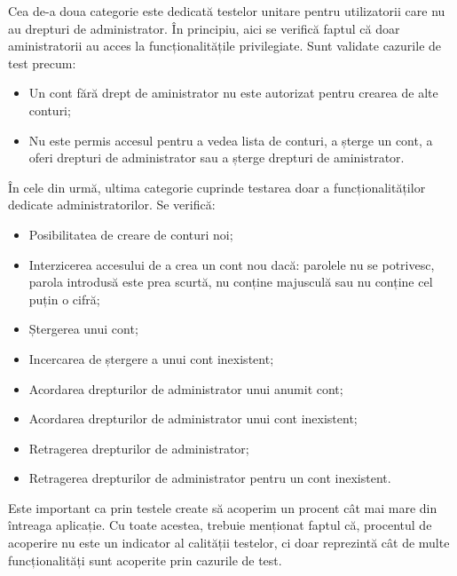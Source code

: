 \vspace{2em}

	Cea de-a doua categorie este dedicată testelor unitare pentru utilizatorii care nu au drepturi de administrator. În principiu, aici se verifică faptul că doar aministratorii au acces la funcționalitățile privilegiate. Sunt validate cazurile de test precum:
 
	\begin{itemize}
			\setlength{\itemindent}{2em}
			\itemsep0em
			\item Un cont fără drept de aministrator nu este autorizat pentru crearea de alte conturi;
			\item Nu este permis accesul pentru a vedea lista de conturi, a șterge un cont, a oferi drepturi de administrator sau a șterge drepturi de aministrator.
	\end{itemize} 

\vspace{2em}

	În cele din urmă, ultima categorie cuprinde testarea doar a funcționalităților dedicate administratorilor. Se verifică:

	\begin{itemize}
			\setlength{\itemindent}{2em}
			\itemsep0em
			\item Posibilitatea de creare de conturi noi;
			\item Interzicerea accesului de a crea un cont nou dacă: parolele nu se potrivesc, parola introdusă este prea scurtă, nu conține majusculă sau nu conține cel puțin o cifră;
			\item Ștergerea unui cont;
			\item Incercarea de ștergere a unui cont inexistent;
			\item Acordarea drepturilor de administrator unui anumit cont;
			\item Acordarea drepturilor de administrator unui cont inexistent;
			\item Retragerea drepturilor de administrator;
			\item Retragerea drepturilor de administrator pentru un cont inexistent.
	\end{itemize} 

	Este important ca prin testele create să acoperim un procent cât mai mare din întreaga aplicație. Cu toate acestea, trebuie menționat faptul că, procentul de acoperire nu este un indicator al calității testelor, ci doar reprezintă cât de multe funcționalități sunt acoperite prin cazurile de test.

